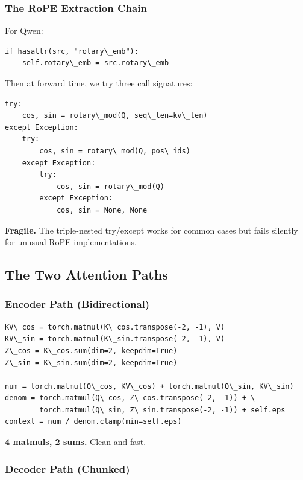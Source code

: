 \subsubsection{The RoPE Extraction Chain}

For Qwen:

\begin{lstlisting}
if hasattr(src, "rotary\_emb"):
    self.rotary\_emb = src.rotary\_emb
\end{lstlisting}

Then at forward time, we try three call signatures:

\begin{lstlisting}
try:
    cos, sin = rotary\_mod(Q, seq\_len=kv\_len)
except Exception:
    try:
        cos, sin = rotary\_mod(Q, pos\_ids)
    except Exception:
        try:
            cos, sin = rotary\_mod(Q)
        except Exception:
            cos, sin = None, None
\end{lstlisting}

\textbf{Fragile.} The triple-nested try/except works for common cases but fails 
silently for unusual RoPE implementations.

\subsection{The Two Attention Paths}

\subsubsection{Encoder Path (Bidirectional)}

\begin{lstlisting}
KV\_cos = torch.matmul(K\_cos.transpose(-2, -1), V)
KV\_sin = torch.matmul(K\_sin.transpose(-2, -1), V)
Z\_cos = K\_cos.sum(dim=2, keepdim=True)
Z\_sin = K\_sin.sum(dim=2, keepdim=True)

num = torch.matmul(Q\_cos, KV\_cos) + torch.matmul(Q\_sin, KV\_sin)
denom = torch.matmul(Q\_cos, Z\_cos.transpose(-2, -1)) + \
        torch.matmul(Q\_sin, Z\_sin.transpose(-2, -1)) + self.eps
context = num / denom.clamp(min=self.eps)
\end{lstlisting}

\textbf{4 matmuls, 2 sums.} Clean and fast.

\subsubsection{Decoder Path (Chunked)}

